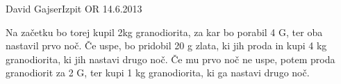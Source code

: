 \begin{naloga}{David Gajser}{Izpit OR 14.6.2013}
\begin{odgovor}
Na začetku bo torej kupil 2kg granodiorita, za kar bo porabil 4 G, ter oba nastavil prvo noč. Če uspe, bo pridobil 20 g zlata, ki 
jih proda in kupi 4 kg granodiorita, ki jih nastavi drugo noč.
Če mu prvo noč ne uspe, potem proda granodiorit za 2 G, ter kupi 1 kg granodiorita, ki ga nastavi drugo noč.

\begin{slika}
\makebox[\textwidth][c]{
\pgfslika
}
\end{slika}
\end{odgovor}
\end{naloga}
